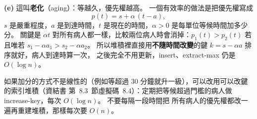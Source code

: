\begin{pastsoln}
\textbf{(e)} 這叫\textbf{老化}（aging）：等越久，優先權越高。 一個有效率的做法是把優先權寫成
\[
p(t) = s + \alpha\,(t - a),
\]
$s$ 是嚴重程度，$a$ 是到達時間，$t$ 是現在的時間，$\alpha > 0$ 是每單位等候時間加多少分。 關鍵是
$\alpha t$ 對所有病人都一樣，比較兩位病人時會消掉：$p_1(t) > p_2(t)$ 若且唯若 $s_1 - \alpha a_1 > s_2 -
\alpha a_2$。 所以堆積裡直接用\textbf{不隨時間改變}的鍵 $k = s - \alpha a$ 排序就好，病人到達時算一次，
之後完全不用更新，insert、extract-max 仍是 $O(\log n)$。

如果加分的方式不是線性的（例如等超過 30 分鐘就升一級），可以改用可以改鍵的索引堆積（資結書
第~8.3~節虛擬碼~8.4）：定期把等候超過門檻的病人做 increase-key，每次 $O(\log n)$。 不要每隔一段時間把
所有病人的優先權都改一遍再重建堆積，那樣每次要 $O(n)$。
\end{pastsoln}
